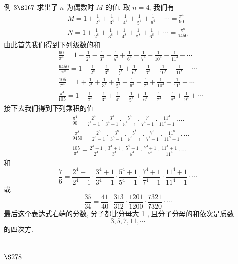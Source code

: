 例 $3 \S 167$ 求出了 $n$ 为偶数时 $M$ 的值, 取 $n=4$, 我们有
\[
\begin{gathered}
M=1+\frac{1}{2^{4}}+\frac{1}{3^{4}}+\frac{1}{4^{4}}+\frac{1}{5^{4}}+\frac{1}{6^{4}}+\cdots=\frac{\pi^{4}}{90} \\
N=1+\frac{1}{2^{8}}+\frac{1}{3^{8}}+\frac{1}{4^{8}}+\frac{1}{5^{8}}+\frac{1}{6^{8}}+\cdots=\frac{\pi^{8}}{9450}
\end{gathered}
\]
由此首先我们得到下列级数的和
\[
\begin{gathered}
\frac{90}{\pi^{4}}=1-\frac{1}{2^{4}}-\frac{1}{3^{4}}-\frac{1}{5^{4}}+\frac{1}{6^{4}}-\frac{1}{7^{4}}+\frac{1}{10^{4}}-\frac{1}{11^{4}}-\cdots \\
\frac{9450}{\pi^{8}}=1-\frac{1}{2^{8}}-\frac{1}{3^{8}}-\frac{1}{5^{8}}+\frac{1}{6^{8}}-\frac{1}{7^{8}}+\frac{1}{10^{8}}-\frac{1}{11^{8}}-\cdots \\
\frac{105}{\pi^{4}}=1+\frac{1}{2^{4}}+\frac{1}{3^{4}}+\frac{1}{5^{4}}+\frac{1}{6^{4}}+\frac{1}{7^{4}}+\frac{1}{10^{4}}+\frac{1}{11^{4}}+\cdots
\end{gathered}
\]
\[
\begin{aligned}
& \frac{\pi^{4}}{105}=1-\frac{1}{2^{4}}-\frac{1}{3^{4}}+\frac{1}{4^{4}}-\frac{1}{5^{4}}+\frac{1}{6^{4}}-\frac{1}{7^{4}}-\frac{1}{8^{4}}+\frac{1}{9^{4}}+\cdots
\end{aligned}
\]
接下去我们得到下列乘积的值
\[
\begin{aligned}
& \frac{\pi^{4}}{90}=\frac{2^{4}}{2^{4}-1} \cdot \frac{3^{4}}{3^{4}-1} \cdot \frac{5^{4}}{5^{4}-1} \cdot \frac{7^{4}}{7^{4}-1} \cdot \frac{11^{4}}{11^{4}-1} \cdot \cdots \\
& \frac{\pi^{8}}{9450}=\frac{2^{8}}{2^{8}-1} \cdot \frac{3^{8}}{3^{8}-1} \cdot \frac{5^{8}}{5^{8}-1} \cdot \frac{7^{8}}{7^{8}-1} \cdot \frac{11^{8}}{11^{8}-1} \cdot \cdots \\
& \frac{105}{\pi^{4}}=\frac{2^{4}+1}{2^{4}} \cdot \frac{3^{4}+1}{3^{4}} \cdot \frac{5^{4}+1}{5^{4}} \cdot \frac{7^{4}+1}{7^{4}} \cdot \frac{11^{4}+1}{11^{4}} \cdot \cdots
\end{aligned}
\]
和
\[
\frac{7}{6}=\frac{2^{4}+1}{2^{4}-1} \cdot \frac{3^{4}+1}{3^{4}-1} \cdot \frac{5^{4}+1}{5^{4}-1} \cdot \frac{7^{4}+1}{7^{4}-1} \cdot \frac{11^{4}+1}{11^{4}-1} \cdot \cdots
\]
或
\[
\frac{35}{34}=\frac{41}{40} \cdot \frac{313}{312} \cdot \frac{1201}{1200} \cdot \frac{7321}{7320} \cdot \cdots
\]
最后这个表达式右端的分数, 分子都比分母大 1 , 且分子分母的和依次是质数
\[
3,5,7,11, \cdots
\]
的四次方.

\section{$\S 278$}

